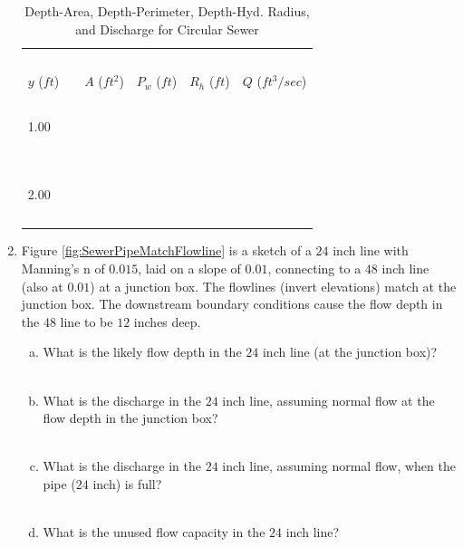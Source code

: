 \documentclass[11pt]{article}
\begin{document}
\begin{enumerate}
\begin{table}[htbp]
   \centering
   \caption{Depth-Area, Depth-Perimeter, Depth-Hyd. Radius, and Discharge for Circular Sewer}
   \begin{tabular}{p{1in}p{1in}p{1in}p{1in}p{1in}}
   ~ & ~ & ~  & ~ & ~ \\
$y$ ($ft$)~~& $A$ ($ft^2$) & $P_w$ ($ft$) & $R_h$ ($ft$) & $Q$ ($ft^3/sec$) \\
\hline
\hline
~ & ~ & ~  & ~ & ~ \\
1.00 & ~ & ~  & ~ & ~ \\
~& ~ & ~  & ~ & ~ \\
\hline
~ & ~ & ~  & ~ & ~ \\
2.00 & ~ & ~  & ~ & ~ \\
~ & ~ & ~  & ~ & ~ \\
\hline
   \end{tabular}
   \label{tab:SewerPipes}
\end{table}
\clearpage
\item Figure \ref{fig:SewerPipeMatchFlowline} is a sketch of a $24$ inch line with Manning's n of $0.015$, laid on a slope of $0.01$, connecting to a $48$ inch line (also at $0.01$) at a junction box.   The flowlines (invert elevations) match at the junction box.  The downstream boundary conditions cause the flow depth in the $48$ line to be $12$ inches deep.

\begin{enumerate}[a)]
\item What is the likely flow depth in the $24$ inch line (at the junction box)? \\~\\
\item What is the discharge in the $24$ inch line, assuming normal flow at the flow depth in the junction box? \\~\\
\item What is the discharge in the $24$ inch line, assuming normal flow, when the pipe ($24$ inch) is full? \\~\\
\item What is the unused flow capacity in the $24$ inch line? \\~\\
\end{enumerate}


\end{enumerate}
\end{document}
